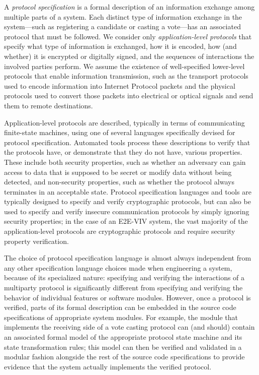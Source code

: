 A \emph{protocol specification} is a formal description of an
information exchange among multiple parts of a system. Each distinct
type of information exchange in the system---such as registering a
candidate or casting a vote---has an associated protocol that must be
followed. We consider only \emph{application-level protocols} that
specify what type of information is exchanged, how it is encoded, how
(and whether) it is encrypted or digitally signed, and the sequences
of interactions the involved parties perform. We assume the existence
of well-specified lower-level protocols that enable information
transmission, such as the transport protocols used to encode
information into Internet Protocol packets and the physical protocols
used to convert those packets into electrical or optical signals and
send them to remote destinations.

Application-level protocols are described, typically in terms of
communicating finite-state machines, using one of several languages
specifically devised for protocol specification. Automated tools
process these descriptions to verify that the protocols have, or
demonstrate that they do not have, various properties. These include
both security properties, such as whether an adversary can gain access
to data that is supposed to be secret or modify data without being
detected, and non-security properties, such as whether the protocol
always terminates in an acceptable state. Protocol specification
languages and tools are typically designed to specify and verify
cryptographic protocols, but can also be used to specify and verify
insecure communication protocols by simply ignoring security
properties; in the case of an E2E-VIV system, the vast majority of the
application-level protocols are cryptographic protocols and require
security property verification.

The choice of protocol specification language is almost always
independent from any other specification language choices made when
engineering a system, because of its specialized nature: specifying
and verifying the interactions of a multiparty protocol is
significantly different from specifying and verifying the behavior of
individual features or software modules. However, once a protocol is
verified, parts of its formal description can be embedded in the
source code specifications of appropriate system modules. For example,
the module that implements the receiving side of a vote casting
protocol can (and should) contain an associated formal model of the
appropriate protocol state machine and its state transformation rules;
this model can then be verified and validated in a modular fashion
alongside the rest of the source code specifications to provide
evidence that the system actually implements the verified protocol.

